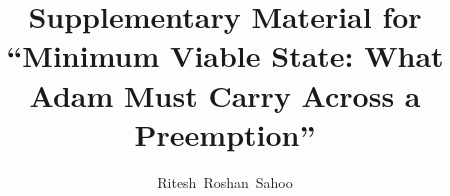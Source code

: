 \documentclass[10pt,journal,compsoc,onecolumn]{IEEEtran}
\begin{document}
\title{Supplementary Material for\\``Minimum Viable State: What Adam Must Carry Across a Preemption''}
\author{Ritesh~Roshan~Sahoo}
\maketitle


\end{document}
